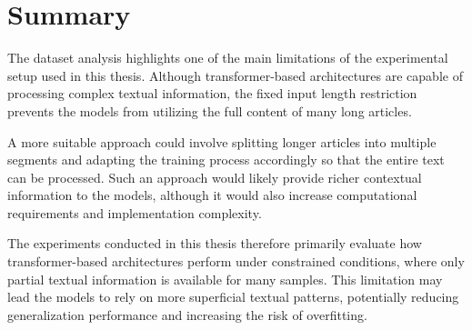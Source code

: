 \section{Summary}

The dataset analysis highlights one of the main limitations of the experimental setup used in this thesis. Although transformer-based architectures are capable of processing complex textual information, the fixed input length restriction prevents the models from utilizing the full content of many long articles.

A more suitable approach could involve splitting longer articles into multiple segments and adapting the training process accordingly so that the entire text can be processed. Such an approach would likely provide richer contextual information to the models, although it would also increase computational requirements and implementation complexity.

The experiments conducted in this thesis therefore primarily evaluate how transformer-based architectures perform under constrained conditions, where only partial textual information is available for many samples. This limitation may lead the models to rely on more superficial textual patterns, potentially reducing generalization performance and increasing the risk of overfitting.



